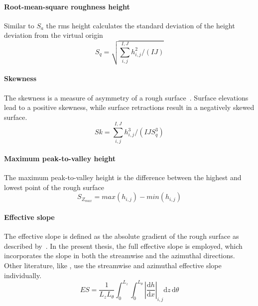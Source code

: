 \paragraph{Root-mean-square roughness height}
Similar to $S_a$ the rms height calculates the standard deviation of the height deviation from the virtual origin
\begin{equation}
    S_q = \sqrt{\sum_{i,j}^{I,J} h_{i,j}^{2} / (IJ)}
\end{equation}

\paragraph{Skewness}
The skewness is a measure of asymmetry of a rough surface~\cite{chungPredictingDragRough2021}.
Surface elevations lead to a positive skewness, while surface retractions result in a negatively skewed surface.
\begin{equation}
    Sk = \sum_{i,j}^{I,J} h^{3}_{i,j} /(IJS_{q}^{3})
\end{equation}

\paragraph{Maximum peak-to-valley height}
The maximum peak-to-valley height is the difference between the highest and lowest point of the rough surface
\begin{equation}
    S_{Z_{max}} = max(h_{i,j}) - min(h_{i,j})
\end{equation}

\paragraph{Effective slope}
The effective slope is defined as the absolute gradient of the rough surface as described by~\cite{napoliEffectSlopeIrregularly2008}.
In the present thesis, the full effective slope is employed, which incorporates the slope in both the streamwise and the azimuthal directions.
Other literature, like \citep{jellyReynoldsDispersiveShear2018,maDirectNumericalSimulation2021}, use the streamwise and azimuthal effective slope individually.
\begin{equation}
    ES = \frac{1}{L_z L_\theta} \int_0^{L_z} \int_0^{L_\theta} \left| \frac{\mathrm{d}h}{\mathrm{d}x} \right|_{i,j} \mathrm{d}z \, \mathrm{d}\theta
\end{equation}
